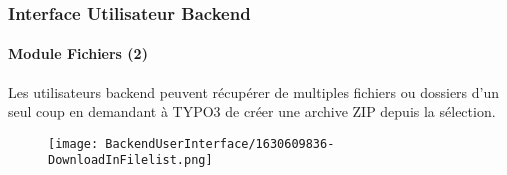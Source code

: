 %

\begin{frame}[fragile]
	\frametitle{Interface Utilisateur Backend}
	\framesubtitle{Module Fichiers (2)}

	Les utilisateurs backend peuvent récupérer de multiples fichiers ou dossiers d'un seul
	coup en demandant à TYPO3 de créer une archive ZIP depuis la sélection.

	\begin{figure}
		\texttt{[image: BackendUserInterface/1630609836-DownloadInFilelist.png]}
	\end{figure}

\end{frame}

